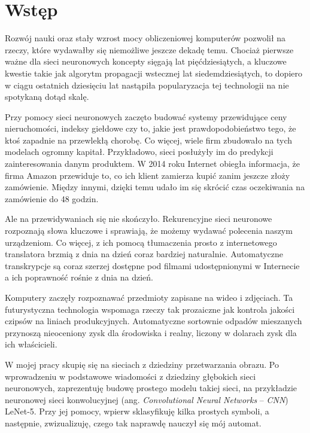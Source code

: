 \chapter{Wstęp}
\label{cha:wstep}

Rozwój nauki oraz stały wzrost mocy obliczeniowej komputerów pozwolił na rzeczy, które wydawałby się niemożliwe jeszcze dekadę temu. Chociaż pierwsze ważne dla sieci neuronowych koncepty sięgają lat pięćdziesiątych, a kluczowe kwestie takie jak algorytm propagacji wstecznej lat siedemdziesiątych, to dopiero w ciągu ostatnich dziesięciu lat nastąpiła popularyzacja tej technologii na nie spotykaną dotąd skalę.

Przy pomocy sieci neuronowych zaczęto budować systemy przewidujące ceny nieruchomości, indeksy giełdowe czy to, jakie jest prawdopodobieństwo tego, że ktoś zapadnie na przewlekłą chorobę. Co więcej, wiele firm zbudowało na tych modelach ogromny kapitał. Przykładowo, sieci posłużyły im do predykcji zainteresowania danym produktem. W 2014 roku Internet obiegła informacja, że firma Amazon przewiduje to, co ich klient zamierza kupić zanim jeszcze złoży zamówienie. Między innymi, dzięki temu udało im się skrócić czas oczekiwania na zamówienie do 48 godzin.

Ale na przewidywaniach się nie skończyło. Rekurencyjne sieci neuronowe rozpoznają słowa kluczowe i sprawiają, że możemy wydawać polecenia naszym urządzeniom. Co więcej, z ich pomocą tłumaczenia prosto z internetowego translatora brzmią z dnia na dzień coraz bardziej naturalnie. Automatyczne transkrypcje są coraz szerzej dostępne pod filmami udostępnionymi w Internecie a ich poprawność rośnie z dnia na dzień.

Komputery zaczęły rozpoznawać przedmioty zapisane na wideo i zdjęciach.  Ta futurystyczna technologia wspomaga rzeczy tak prozaiczne jak kontrola jakości czipsów na liniach produkcyjnych. Automatyczne sortownie odpadów mieszanych przynoszą nieoceniony zysk dla środowiska i realny, liczony w dolarach zysk dla ich właścicieli. 

W mojej pracy skupię się na sieciach z dziedziny przetwarzania obrazu. Po wprowadzeniu w podstawowe wiadomości z dziedziny głębokich sieci neuronowych, zaprezentuję budowę prostego modelu takiej sieci, na przykładzie neuronowej sieci konwolucyjnej (ang. \textit{Convolutional Neural Networks} – \textit{CNN}) LeNet-5. 
Przy jej pomocy, wpierw sklasyfikuję kilka prostych symboli, a następnie, zwizualizuję, czego tak naprawdę nauczył się mój automat.

